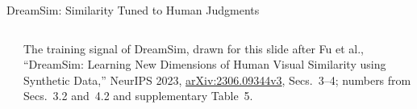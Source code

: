 \begin{frame}{DreamSim: Similarity Tuned to Human Judgments}
\begin{columns}[T,onlytextwidth]
\\[0.3em]
      {\scriptsize The training signal of DreamSim, drawn for this slide after Fu et al., ``DreamSim: Learning New Dimensions of Human Visual Similarity using Synthetic Data,'' NeurIPS 2023, \href{https://arxiv.org/abs/2306.09344v3}{arXiv:2306.09344v3}, Secs.~3--4; numbers from Secs.~3.2 and~4.2 and supplementary Table~5.\par}
  \end{columns}
\end{frame}

